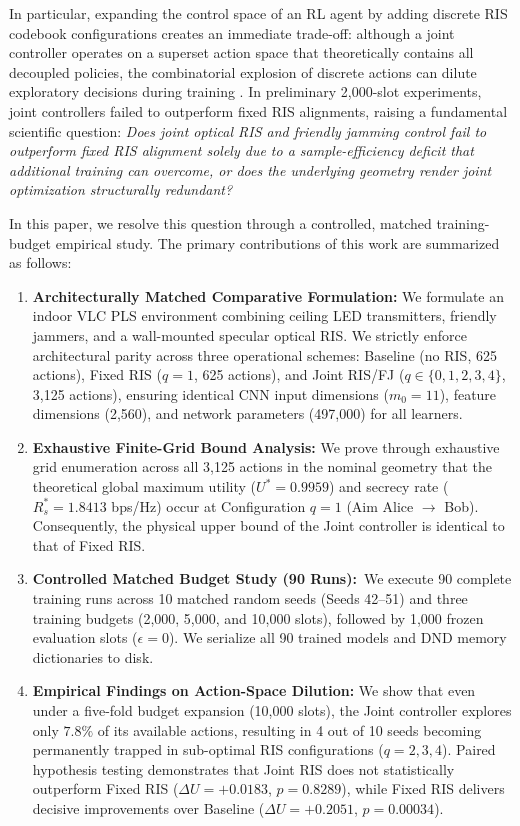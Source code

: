 \documentclass[journal,10pt,twocolumn]{IEEEtran}
\begin{document}
In particular, expanding the control space of an RL agent by adding discrete RIS codebook configurations creates an immediate trade-off: although a joint controller operates on a superset action space that theoretically contains all decoupled policies, the combinatorial explosion of discrete actions can dilute exploratory decisions during training \cite{liu2024smart}. In preliminary 2,000-slot experiments, joint controllers failed to outperform fixed RIS alignments, raising a fundamental scientific question: \emph{Does joint optical RIS and friendly jamming control fail to outperform fixed RIS alignment solely due to a sample-efficiency deficit that additional training can overcome, or does the underlying geometry render joint optimization structurally redundant?}

In this paper, we resolve this question through a controlled, matched training-budget empirical study. The primary contributions of this work are summarized as follows:
\begin{enumerate}
    \item \textbf{Architecturally Matched Comparative Formulation:} We formulate an indoor VLC PLS environment combining ceiling LED transmitters, friendly jammers, and a wall-mounted specular optical RIS. We strictly enforce architectural parity across three operational schemes: Baseline (no RIS, 625 actions), Fixed RIS ($q=1$, 625 actions), and Joint RIS/FJ ($q \in \{0, 1, 2, 3, 4\}$, 3,125 actions), ensuring identical CNN input dimensions ($m_0=11$), feature dimensions (2,560), and network parameters (497,000) for all learners.
    \item \textbf{Exhaustive Finite-Grid Bound Analysis:} We prove through exhaustive grid enumeration across all 3,125 actions in the nominal geometry that the theoretical global maximum utility ($U^* = 0.9959$) and secrecy rate ($R_s^* = 1.8413$ bps/Hz) occur at Configuration $q=1$ (Aim Alice $\to$ Bob). Consequently, the physical upper bound of the Joint controller is identical to that of Fixed RIS.
    \item \textbf{Controlled Matched Budget Study (90 Runs):}\ We execute 90 complete training runs across 10 matched random seeds (Seeds 42--51) and three training budgets (2,000, 5,000, and 10,000 slots), followed by 1,000 frozen evaluation slots ($\epsilon=0$). We serialize all 90 trained models and DND memory dictionaries to disk.
    \item \textbf{Empirical Findings on Action-Space Dilution:} We show that even under a five-fold budget expansion (10,000 slots), the Joint controller explores only $7.8\%$ of its available actions, resulting in 4 out of 10 seeds becoming permanently trapped in sub-optimal RIS configurations ($q=2, 3, 4$). Paired hypothesis testing demonstrates that Joint RIS does not statistically outperform Fixed RIS ($\Delta U = +0.0183$, $p = 0.8289$), while Fixed RIS delivers decisive improvements over Baseline ($\Delta U = +0.2051$, $p = 0.00034$).
\end{enumerate}
\end{document}
